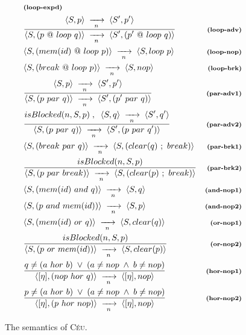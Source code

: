 \documentclass{acm_proc_article-sp}
\newcommand{\CEU}{\textsc{C\'{e}u}\xspace}
\newcommand{\ST}{\1\xrightarrow[~n~]{}\1}
\newcommand{\LL}{\langle}
\newcommand{\RR}{\rangle}
\newcommand{\DS}{\displaystyle}
\newcommand{\rr}[1] {{\textbf{\scriptsize{#1}}}}
\newcommand{\1}{\;}
\newcommand{\2}{\;\;}
\newcommand{\3}{\;\;\;}
\newcommand{\5}{\;\;\;\;\;}
\begin{document}
\begin{figure}
{\begin{eqnarray*}
    & \rr{(loop-expd)}       \\
& \frac
    {\DS \LL S,p \RR \ST \LL S',p' \RR }
    {\DS \LL S, (p~@~loop~q) \RR \ST \LL S', (p'~@~loop~q) \RR }
    & \rr{(loop-adv)}    \\
& \LL S, (mem(id)~@~loop~p) \RR \ST \LL S, loop~p \RR
    & \rr{(loop-nop)}    \\
& \LL S, (break~@~loop~p) \RR \ST \LL S, nop \RR
    & \rr{(loop-brk)}       \\
%
& \frac
    {\DS \LL S,p \RR \ST \LL S',p' \RR }
    {\DS \LL S, (p~par~q) \RR \ST \LL S', (p'~par~q) \RR }
    & \rr{(par-adv1)}      \\
& \frac
    {\DS isBlocked(n,S,p) \1,\2 \LL S,q \RR \ST \LL S',q' \RR }
    {\DS \LL S, (p~par~q) \RR \ST \LL S', (p~par~q') \RR }
    & \rr{(par-adv2)}      \\
& \LL S, (break~par~q) \RR \ST \LL S, (clear(q)~;~break) \RR
    & \rr{(par-brk1)}   \\
& \frac
    {\DS isBlocked(n,S,p) }
    {\DS \LL S, (p~par~break) \RR \ST \LL S, (clear(p)~;~break) \RR }
    & \rr{(par-brk2)}   \\
%
%
& \LL S, (mem(id)~and~q) \RR \ST \LL S, q \RR
    & \rr{(and-nop1)}   \\
& \LL S, (p~and~mem(id)) \RR \ST \LL S, p \RR
    & \rr{(and-nop2)}   \\
& \LL S, (mem(id)~or~q) \RR \ST \LL S, clear(q) \RR
    & \rr{(or-nop1)}   \\
& \frac
    {\DS isBlocked(n,S,p) }
    {\DS \LL S, (p~or~mem(id)) \RR \ST \LL S, clear(p) \RR }
    & \rr{(or-nop2)}   \\
& \frac
    {\DS q \neq (a~hor~b) \1\vee\1 (a \neq nop \1\wedge\1 b \neq nop) }
    {\DS \LL [\eta], (nop~hor~q) \RR \ST \LL [\eta], nop \RR }
    & \rr{(hor-nop1)}   \\
& \frac
    {\DS p \neq (a~hor~b) \1\vee\1 (a \neq nop \1\wedge\1 b \neq nop) }
    {\DS \LL [\eta], (p~hor~nop) \RR \ST \LL [\eta], nop \RR }
    & \rr{(hor-nop2)}
%
\end{eqnarray*}
}
%
\caption{ The semantics of \CEU.
\label{fig.sem}
}
\end{figure}
\end{document}
